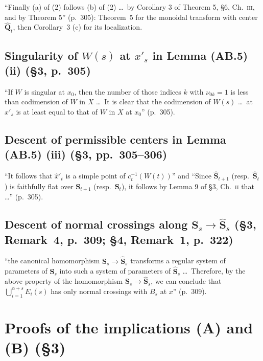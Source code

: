 ``Finally (a) of (2) follows (b) of (2) \dots\ by Corollary 3 of Theorem 5, \S6, Ch.~\textsc{iii}, and by Theorem 5'' (p.~305):
Theorem~5 for the monoidal transform with center $\hat{\mathbf Q}_t$, then Corollary~3 (c) for its localization.


\subsection*{Singularity of $W(s)$ at $x'_s$ in Lemma (AB.5) (ii) (\S3, p.~305)}

``If $W$ is singular at $x_0$, then the number of those indices $k$ with $\nu_{0k}=1$ is less than codimension of $W$ in $X$
\dots\ It is clear that the codimension of $W(s)$ \dots\ at $x'_s$ is at least equal to that of $W$ in $X$ at $x_0$'' (p.~305).


\subsection*{Descent of permissible centers in Lemma (AB.5) (iii) (\S3, pp.~305--306)}

``It follows that $\hat x'_t$ is a simple point of $c_t^{-1}(W(t))$'' and ``Since $\hat{\mathbf S}_{t+1}$ (resp.\ $\hat{\mathbf S}_t$) is
faithfully flat over $\mathbf S_{t+1}$ (resp.\ $\mathbf S_t$), it follows by Lemma 9 of \S3, Ch.~\textsc{ii} that \dots'' (p.~305).


\subsection*{Descent of normal crossings along $\mathbf S_s\to\hat{\mathbf S}_s$ (\S3, Remark~4, p.~309; \S4, Remark~1, p.~322)}

``the canonical homomorphism $\mathbf S_s\to\hat{\mathbf S}_s$ transforms a regular system of parameters of $\mathbf S_s$ into such a
system of parameters of $\hat{\mathbf S}_s$ \dots\ Therefore, by the above property of the homomorphism $\mathbf S_s\to\hat{\mathbf
S}_s$, we can conclude that $\bigcup_{i=1}^{\alpha+s}E_i(s)$ has only normal crossings with $B_s$ at $x$'' (p.~309).


\section{Proofs of the implications (A) and (B) (\S3)}
